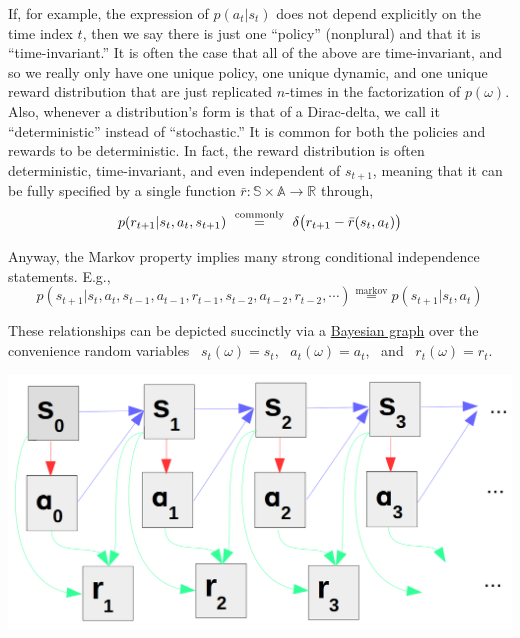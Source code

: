 If, for example, the expression of $p(a_t|s_t)$ does not depend explicitly on the time index $t$, then we say there is just one ``policy'' (nonplural) and that it is ``time-invariant.'' It is often the case that all of the above are time-invariant, and so we really only have one unique policy, one unique dynamic, and one unique reward distribution that are just replicated $n$-times in the factorization of $p(\omega)$.\\

Also, whenever a distribution's form is that of a Dirac-delta, we call it ``deterministic'' instead of ``stochastic.'' It is common for both the policies and rewards to be deterministic. In fact, the reward distribution is often deterministic, time-invariant, and even independent of $s_{t+1}$, meaning that it can be fully specified by a single function $\bar{r}:\mathbb{S}\times\mathbb{A} \to \mathbb{R}$ through,
\begin{equation*}
p(r_{t+1}|s_t,a_t,s_{t+1}) \ \stackrel{\text{commonly}}{=} \ \delta\big{(}r_{t+1} - \bar{r}(s_t, a_t)\big{)}
\end{equation*}

Anyway, the Markov property implies many strong conditional independence statements. E.g.,
\begin{equation*}
p(s_{t+1}|s_t,a_t,s_{t-1},a_{t-1},r_{t-1},s_{t-2},a_{t-2},r_{t-2},\cdots) \stackrel{\text{markov}}{=} p(s_{t+1}|s_t,a_t)
\end{equation*}

These relationships can be depicted succinctly via a \href{https://en.wikipedia.org/wiki/Bayesian_network}{Bayesian graph} over the convenience random variables \ ${s_t}(\omega) = s_t$, \ ${a_t}(\omega) = a_t$, \ and \ ${r_t}(\omega) = r_t$.
\begin{center}
  \includegraphics[width=\linewidth-1.5in]{include/bayesgraph.png}
\end{center}

